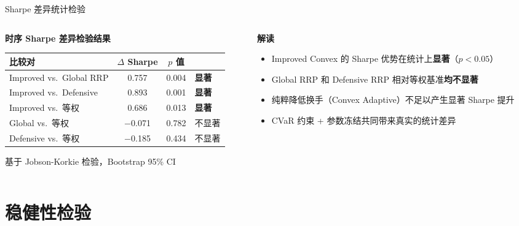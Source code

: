 \documentclass[aspectratio=169,11pt]{beamer}
\newcommand{\improvedVsGlobalDiff}{0.757}
\newcommand{\improvedVsGlobalPValue}{0.004}
\newcommand{\improvedVsEqualPValue}{0.013}
\begin{document}
\begin{frame}{Sharpe 差异统计检验}
  \begin{columns}[T]
    \begin{column}{0.58\textwidth}
      \textbf{时序 Sharpe 差异检验结果}\\[0.3em]
      \footnotesize
      \renewcommand{\arraystretch}{1.25}
      \begin{tabular}{@{}lccl@{}}
        \toprule
        比较对 & $\Delta$ Sharpe & $p$ 值 & \\
        \midrule
        Improved vs.\ Global RRP & \improvedVsGlobalDiff & \improvedVsGlobalPValue & \textbf{显著} \\
        Improved vs.\ Defensive  & 0.893 & 0.001 & \textbf{显著} \\
        Improved vs.\ 等权        & 0.686 & \improvedVsEqualPValue & \textbf{显著} \\
        Global vs.\ 等权          & $-$0.071 & 0.782 & 不显著 \\
        Defensive vs.\ 等权       & $-$0.185 & 0.434 & 不显著 \\
        \bottomrule
      \end{tabular}
      \vspace{0.3em}
      \scriptsize 基于 Jobson-Korkie 检验，Bootstrap 95\% CI
    \end{column}
    \begin{column}{0.42\textwidth}
      \textbf{解读}
      \begin{itemize}
        \item Improved Convex 的 Sharpe 优势在统计上\textbf{显著}（$p < 0.05$）
        \item Global RRP 和 Defensive RRP 相对等权基准\textbf{均不显著}
        \item 纯粹降低换手（Convex Adaptive）不足以产生显著 Sharpe 提升
        \item CVaR 约束 + 参数冻结共同带来真实的统计差异
      \end{itemize}
    \end{column}
  \end{columns}
\end{frame}

\section{稳健性检验}
\end{document}
